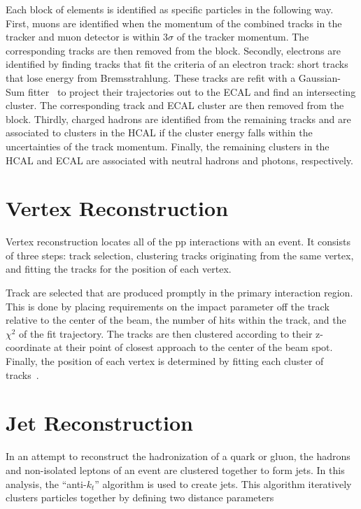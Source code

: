 Each block of elements is identified as specific particles in the following way. First, muons are identified when the momentum of the combined tracks in the tracker and muon detector is within $3 \sigma$ of the tracker momentum. The corresponding tracks are then removed from the block. Secondly, electrons are identified by finding tracks that fit the criteria of an electron track: short tracks that lose energy from Bremsstrahlung. These tracks are refit with a Gaussian-Sum fitter~\cite{GausSumFilter} to project their trajectories out to the ECAL and find an intersecting cluster. The corresponding track and ECAL cluster are then removed from the block. Thirdly, charged hadrons are identified from the remaining tracks and are associated to clusters in the HCAL if the cluster energy falls within the uncertainties of the track momentum. Finally, the remaining clusters in the HCAL and ECAL are associated with neutral hadrons and photons, respectively. 

\section{Vertex Reconstruction}

Vertex reconstruction locates all of the pp interactions with an event. It consists of three steps: track selection, clustering tracks originating from the same vertex, and fitting the tracks for the position of each vertex. 


Track are selected that are produced promptly in the primary interaction region. This is done by placing requirements on the impact parameter off the track relative to the center of the beam, the number of hits within the track, and the $\chi^{2}$ of the fit trajectory. The tracks are then clustered according to their z-coordinate at their point of closest approach to the center of the beam spot. Finally, the position of each vertex is determined by fitting each cluster of tracks~\cite{TrackReco}. 

\section{Jet Reconstruction}
In an attempt to reconstruct the hadronization of a quark or gluon, the hadrons and non-isolated leptons of an event are clustered together to form jets. In this analysis, the ``anti-$k_{t}$'' algorithm is used to create jets. This algorithm iteratively clusters particles together by defining two distance parameters

